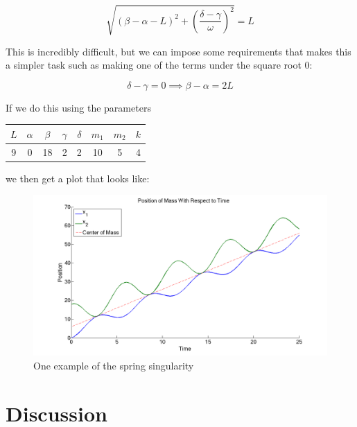 \documentclass[11pt, oneside]{article}   	%
\begin{document}
$$\sqrt{(\beta - \alpha -L)^2 + \left(\frac{\delta - \gamma}{\omega}\right)^2}=L$$

This is incredibly difficult, but we can impose some requirements that makes this a simpler task such as making one of the terms under the square root $0$:

$$\delta - \gamma = 0 \implies \beta - \alpha = 2L$$

If we do this using the parameters

\begin{center}

\begin{tabular}{| c | c | c | c | c | c | c | c |}

\hline

$L$ & $\alpha$ & $\beta$ & $\gamma$ & $\delta$ & $m_1$ & $m_2$ & $k$ \\

\hline

 9 & 0 & 18 & 2 & 2 & 10 & 5 & 4\\

\hline

\end{tabular}

\end{center}

we then get a plot that looks like: \\

\begin{figure}[h!]
\centering \includegraphics[scale=0.3]{spring_sing}
\caption{\label{singularity}One example of the spring singularity}
\end{figure}



\section{Discussion}
\newpage
\end{document}
